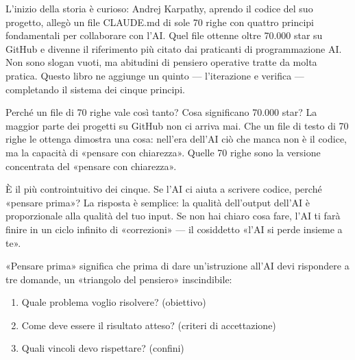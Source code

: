 

L'inizio della storia è curioso: Andrej Karpathy, aprendo il codice del suo progetto, allegò un file CLAUDE.md di sole 70 righe con quattro principi fondamentali per collaborare con l'AI. Quel file ottenne oltre 70.000 star su GitHub e divenne il riferimento più citato dai praticanti di programmazione AI. Non sono slogan vuoti, ma abitudini di pensiero operative tratte da molta pratica. Questo libro ne aggiunge un quinto — l'iterazione e verifica — completando il sistema dei cinque principi.

\begin{tcbinfo}{Perché un file di 70 righe vale così tanto?}
Cosa significano 70.000 star? La maggior parte dei progetti su GitHub non ci arriva mai. Che un file di testo di 70 righe le ottenga dimostra una cosa: nell'era dell'AI ciò che manca non è il codice, ma la capacità di «pensare con chiarezza». Quelle 70 righe sono la versione concentrata del «pensare con chiarezza».

\end{tcbinfo}


È il più controintuitivo dei cinque. Se l'AI ci aiuta a scrivere codice, perché «pensare prima»? La risposta è semplice: la qualità dell'output dell'AI è proporzionale alla qualità del tuo input. Se non hai chiaro cosa fare, l'AI ti farà finire in un ciclo infinito di «correzioni» — il cosiddetto «l'AI si perde insieme a te».

«Pensare prima» significa che prima di dare un'istruzione all'AI devi rispondere a tre domande, un «triangolo del pensiero» inscindibile:

\begin{enumerate}
  \item Quale problema voglio risolvere? (obiettivo)
  \item Come deve essere il risultato atteso? (criteri di accettazione)
  \item Quali vincoli devo rispettare? (confini)
\end{enumerate}

